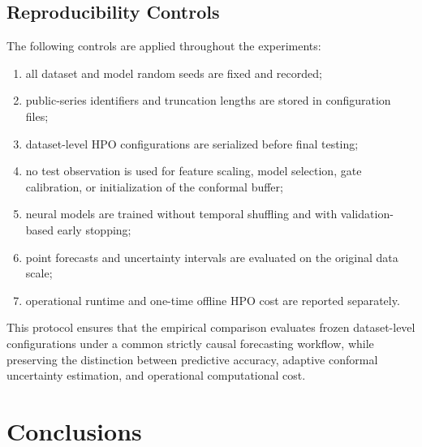 \documentclass[review,number,sort&compress]{elsarticle}
\begin{document}
\subsection{Reproducibility Controls}
\label{subsec:reproducibility}

The following controls are applied throughout the experiments:

\begin{enumerate}
    \item all dataset and model random seeds are fixed and recorded;

    \item public-series identifiers and truncation lengths are stored in
    configuration files;

    \item dataset-level HPO configurations are serialized before final testing;

    \item no test observation is used for feature scaling, model selection,
    gate calibration, or initialization of the conformal buffer;

    \item neural models are trained without temporal shuffling and with
    validation-based early stopping;


    \item point forecasts and uncertainty intervals are evaluated on the
    original data scale;

    \item operational runtime and one-time offline HPO cost are reported
    separately.
\end{enumerate}

This protocol ensures that the empirical comparison evaluates frozen
dataset-level configurations under a common strictly causal forecasting
workflow, while preserving the distinction between predictive accuracy,
adaptive conformal uncertainty estimation, and operational computational cost.



\section{Conclusions}
\end{document}

